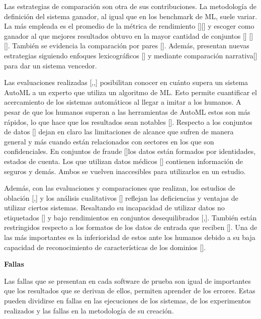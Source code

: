Las estrategias de comparación son otra de sus contribuciones. La metodología de definición del sistema ganador, al igual que en los benchmark de ML, suele variar. 
La más empleada es el promedio de la métrica de rendimiento [\cite{15}][\cite{31}] y escoger como ganador al que mejores resultados obtuvo en la mayor cantidad de 
conjuntos [\cite{18}] [\cite{10}] [\cite{9}]. También se evidencia la comparación por pares [\cite{10}]. Además, presentan nuevas estrategias siguiendo enfoques 
lexicográficos [\cite{25}] y mediante comparación narrativa[\cite{14}] para dar un sistema vencedor.

Las evaluaciones realizadas [\cite{19},\cite{20},\cite{21}] posibilitan conocer en cuánto supera un sistema AutoML a un experto que utiliza un algoritmo de ML. 
Esto permite cuantificar el acercamiento de los sistemas automáticos al llegar a imitar a los humanos. A pesar de que los humanos superan a las herramientas de 
AutoML estos son más rápidos, lo que hace que los resultados sean notables [\cite{22}]. Respecto a los conjuntos de datos [\cite{30}] dejan en claro las limitaciones 
de alcance que sufren de manera general y más cuando están relacionados con sectores en los que son confidenciales. En conjuntos de fraude [\cite{33}]los datos están 
formados por identidades, estados de cuenta. Los que utilizan datos médicos [\cite{33}] contienen información de seguros y demás. Ambos se vuelven inaccesibles para 
utilizarlos en un estudio.

Además, con las evaluaciones y comparaciones que realizan, los estudios de oblación [\cite{17},\cite{29}] y los análisis cualitativos [\cite{31}] reflejan las 
deficiencias y ventajas de utilizar ciertos sistemas. Resaltando su incapacidad de utilizar datos no etiquetados [\cite{26}] y bajo rendimientos en conjuntos 
desequilibrados [\cite{30},\cite{32}]. También están restringidos respecto a los formatos de los datos de entrada que reciben [\cite{27}]. Una de las más importantes 
es la inferioridad de estos ante los humanos debido a su baja capacidad de reconocimiento de características de los dominios [\cite{19}].

\begin{flushleft} 
    {\large { \textbf{Fallas}}}\label{subsection:fallas_AutoML}
\end{flushleft}
Las fallas que se presentan en cada software de prueba son igual de importantes que los resultados que se derivan de ellos, permiten aprender de los errores. 
Estas pueden dividirse en fallas en las ejecuciones de los sistemas, de los experimentos realizados y las fallas en la metodología de su creación.

